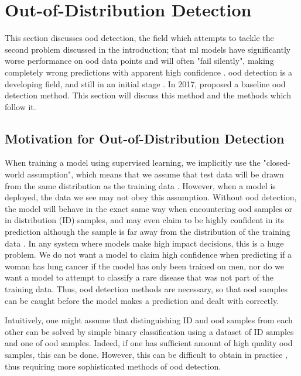 \documentclass[UKenglish]{uiomasterthesis} %
\theoremstyle{definition}
\begin{document}



\section{Out-of-Distribution Detection} \label{ood_intro}

This section discusses \ac{ood} detection, the field which attempts to tackle the second problem discussed in the introduction; that \ac{ml} models have significantly worse performance on \ac{ood} data points and will often "fail silently", making completely wrong predictions with apparent high confidence \cite{adversarial}. \ac{ood} detection is a developing field, and still in an initial stage \cite{ooddl}. In 2017, \cite{oodbaseline} proposed a baseline \ac{ood} detection method. This section will discuss this method and the methods which follow it.

\subsection{Motivation for Out-of-Distribution Detection}

When training a model using supervised learning, we implicitly use the "closed-world assumption", which means that we assume that test data will be drawn from the same distribution as the training data \cite{oodoverview}. However, when a model is deployed, the data we see may not obey this assumption. Without \ac{ood} detection, the model will behave in the exact same way when encountering \ac{ood} samples or in distribution (ID) samples, and may even claim to be highly confident in its prediction although the sample is far away from the distribution of the training data \cite[1]{energy}. In any system where models make high impact decisions, this is a huge problem. We do not want a model to claim high confidence when predicting if a woman has lung cancer if the model has only been trained on men, nor do we want a model to attempt to classify a rare disease that was not part of the training data. Thus, \ac{ood} detection methods are necessary, so that \ac{ood} samples can be caught before the model makes a prediction and dealt with correctly.

Intuitively, one might assume that distinguishing ID and \ac{ood} samples from each other can be solved by simple binary classification using a dataset of ID samples and one of \ac{ood} samples. Indeed, if one has sufficient amount of high quality \ac{ood} samples, this can be done. However, this can be difficult to obtain in practice \cite[15]{oodoverview}, thus requiring more sophisticated methods of \ac{ood} detection.
\end{document}
